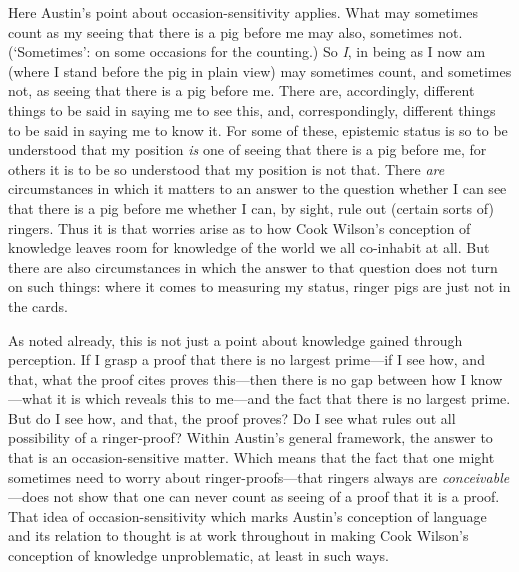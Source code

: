 Here Austin’s point about occasion-sensitivity applies. What may sometimes count as my seeing that there is a pig before me may also, sometimes not. (‘Sometimes’: on some occasions for the counting.) So \emph{I}, in being as I now am (where I stand before the pig in plain view) may sometimes count, and sometimes not, as seeing that there is a pig before me. There are, accordingly, different things to be said in saying me to see this, and, correspondingly, different things to be said in saying me to know it. For some of these, epistemic status is so to be understood that my position \emph{is} one of seeing that there is a pig before me, for others it is to be so understood that my position is not that. There \emph{are} circumstances in which it matters to an answer to the question whether I can see that there is a pig before me whether I can, by sight, rule out (certain sorts of) ringers. Thus it is that worries arise as to how Cook Wilson’s conception of knowledge leaves room for knowledge of the world we all co-inhabit at all. But there are also circumstances in which the answer to that question does not turn on such things: where it comes to measuring my status, ringer pigs are just not in the cards.

As noted already, this is not just a point about knowledge gained through perception. If I grasp a proof that there is no largest prime---if I see how, and that, what the proof cites proves this---then there is no gap between how I know---what it is which reveals this to me—and the fact that there is no largest prime. But do I see how, and that, the proof proves? Do I see what rules out all possibility of a ringer-proof? Within Austin’s general framework, the answer to that is an occasion-sensitive matter. Which means that the fact that one might sometimes need to worry about ringer-proofs—that ringers always are \emph{conceivable}---does not show that one can never count as seeing of a proof that it is a proof. That idea of occasion-sensitivity which marks Austin’s conception of language and its relation to thought is at work throughout in making Cook Wilson’s conception of knowledge unproblematic, at least in such ways.

